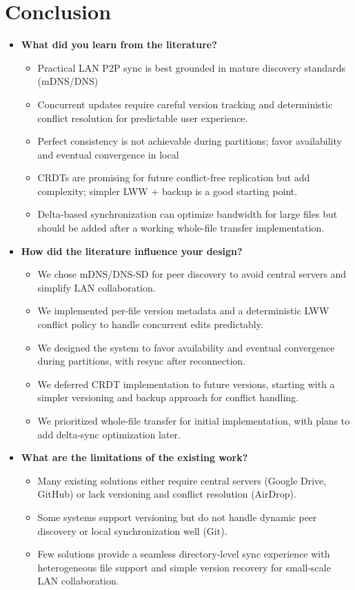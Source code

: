 \documentclass[11pt,oneside]{article}
\begin{document}
\section{Conclusion}
\begin{itemize}
	\item \textbf{What did you learn from the literature?}
	\begin{itemize}
		\item Practical LAN P2P sync is best grounded in mature discovery standards (mDNS/DNS)
		\item Concurrent updates require careful version tracking and deterministic conflict resolution for predictable user experience.
        \item Perfect consistency is not achievable during partitions; favor availability and eventual convergence in local
        \item CRDTs are promising for future conflict-free replication but add complexity; simpler LWW + backup is a good starting point.
        \item Delta-based synchronization can optimize bandwidth for large files but should be added after a working whole-file transfer implementation.
    \end{itemize}
    \item \textbf{How did the literature influence your design?}
    \begin{itemize}
        \item We chose mDNS/DNS-SD for peer discovery to avoid central servers and simplify LAN collaboration.
        \item We implemented per-file version metadata and a deterministic LWW conflict policy to handle concurrent edits predictably.
        \item We designed the system to favor availability and eventual convergence during partitions, with resync after reconnection.
        \item We deferred CRDT implementation to future versions, starting with a simpler versioning and backup approach for conflict handling.
        \item We prioritized whole-file transfer for initial implementation, with plans to add delta-sync optimization later.
    \end{itemize}
    \item \textbf{What are the limitations of the existing work?}
     \begin{itemize}
        \item Many existing solutions either require central servers (Google Drive, GitHub) or lack versioning and conflict resolution (AirDrop).
        \item Some systems support versioning but do not handle dynamic peer discovery or local synchronization well (Git).
        \item Few solutions provide a seamless directory-level sync experience with heterogeneous file support and simple version recovery for small-scale LAN collaboration.
    \end{itemize}
\end{itemize}
\end{document}
